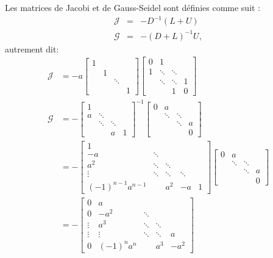 Les matrices de Jacobi et de Gauss-Seidel sont définies comme suit :
\begin{eqnarray}
  \mathcal{J} &=& -D^{-1}(L+U)\\
  \mathcal{G} &=& -(D+L)^{-1}U,
\end{eqnarray}
autrement dit:
\begin{align*}
  \mathcal{J} & = - a
  \begin{bmatrix}
    1 & & &\\
      & 1 & &\\
      & & \ddots & \\
      & & & 1
  \end{bmatrix}
  \begin{bmatrix}
    0 & 1& &\\
    1 & \ddots & \ddots &\\
      & \ddots & \ddots & 1 \\
      & & 1 & 0
  \end{bmatrix}\\
  \mathcal{G} & = -
  \begin{bmatrix}
    1 & & &\\
    a & \ddots &  &\\
      & \ddots & \ddots  &  \\
      & & a & 1
  \end{bmatrix} ^{-1}
  \begin{bmatrix}
    0 & a & &\\
      & \ddots &  \ddots &\\
      &  & \ddots  & a \\
      & &  & 0
  \end{bmatrix}
  \\
  & = -
  \begin{bmatrix}
    1 & & & &\\
    -a & \ddots &  & &\\
    a^2 & \ddots & \ddots  &  &\\
    \vdots & \ddots & \ddots & \ddots & \\
    (-1)^{n-1}a^{n-1} & & a^2 & -a & 1
  \end{bmatrix}
  \begin{bmatrix}
    0 & a & &\\
      & \ddots &  \ddots &\\
      &  & \ddots  & a \\
      & &  & 0
  \end{bmatrix}\\
  & = -
  \begin{bmatrix}
    0 & a & & &\\
    0 & -a^2 & \ddots  & &\\
    \vdots & a^3 & \ddots & \ddots  &\\
    \vdots & \vdots & \ddots & \ddots  & a \\
    0 & (-1)^n a^n & & a^3 & -a^2
  \end{bmatrix}
\end{align*}

